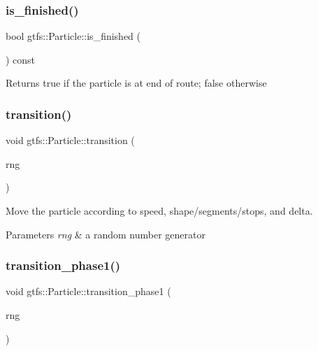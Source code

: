 \subsubsection{\texorpdfstring{is\+\_\+finished()}{is\_finished()}}
{\footnotesize\ttfamily bool gtfs\+::\+Particle\+::is\+\_\+finished (\begin{DoxyParamCaption}{ }\end{DoxyParamCaption}) const\hspace{0.3cm}{\ttfamily [inline]}}

\begin{DoxyReturn}{Returns}
true if the particle is at end of route; false otherwise 
\end{DoxyReturn}
\mbox{\label{classgtfs_1_1Particle_a18aeb1ccbc395210f80c18f9d0a0095c}} 
\subsubsection{\texorpdfstring{transition()}{transition()}}
{\footnotesize\ttfamily void gtfs\+::\+Particle\+::transition (\begin{DoxyParamCaption}\item[{\hyperlink{classsampling_1_1RNG}{sampling\+::\+R\+NG} \&}]{rng }\end{DoxyParamCaption})}

Move the particle according to speed, shape/segments/stops, and {\ttfamily delta}.


\begin{DoxyParams}{Parameters}
{\em rng} & a random number generator \\
\hline
\end{DoxyParams}
\mbox{\label{classgtfs_1_1Particle_a5e964d5aa4698335de3c75938e55f5cd}} 
\subsubsection{\texorpdfstring{transition\+\_\+phase1()}{transition\_phase1()}}
{\footnotesize\ttfamily void gtfs\+::\+Particle\+::transition\+\_\+phase1 (\begin{DoxyParamCaption}\item[{\hyperlink{classsampling_1_1RNG}{sampling\+::\+R\+NG} \&}]{rng }\end{DoxyParamCaption})}

